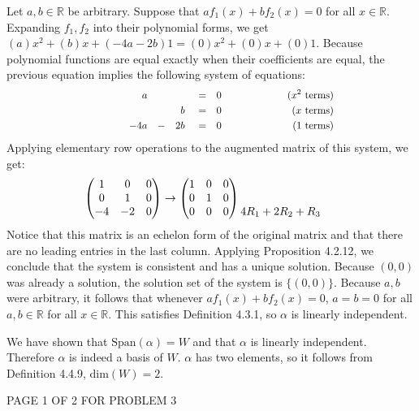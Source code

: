 \documentclass[12pt]{article}
\newenvironment{problem}[2][Problem]
{
	\begin{trivlist} 
		\item[\hskip \labelsep {\bfseries #1 #2:}]
	}
{
	\end{trivlist}
	}
\newenvironment{solution}[1][Solution]
{
	\begin{trivlist} 
		\item[\hskip \labelsep {\itshape #1:}]
	}
	{
	\end{trivlist}
}
\begin{document}
\begin{problem}{3}
\begin{solution}
Let $a,b \in \mathbb{R}$ be arbitrary. Suppose that $a f_1(x) + b f_2(x) = 0$ for all $x \in \mathbb{R}$. Expanding $f_1,f_2$ into their polynomial forms, we get $(a)x^2 +(b)x + (-4a-2b)1=(0)x^2 +(0)x +(0)1$. Because polynomial functions are equal exactly when their coefficients are equal, the previous equation implies the following system of equations:
\begin{align*}
&&&&&&&& &&&&&&&& &&&&&&&& &a& &\hphantom{1}& &\hphantom{1}& &=& &0&  &&&&&&&& \hphantom{100} \text{($x^2$ terms)} &&&&&&&& &&&&&&&& \\
&&&&&&&& &&&&&&&& &&&&&&&& &\hphantom{1}& &\hphantom{1}& &b& &=& &0&  &&&&&&&& \hphantom{100} \text{($x$ terms)} &&&&&&&& &&&&&&&& \\
&&&&&&&& &&&&&&&& &&&&&&&& -4&a& &-& 2&b& &=& &0&  &&&&&&&& \hphantom{100} \text{($1$ terms)} &&&&&&&& &&&&&&&& \\
\end{align*}
Applying elementary row operations to the augmented matrix of this system, we get:
\begin{align*}
\begin{pmatrix} 1&0&0\\0&1&0\\-4&-2&0 \end{pmatrix} &\rightarrow \begin{pmatrix} 1&0&0\\0&1&0\\0&0&0 \end{pmatrix} \begin{matrix} \hphantom{1} \\ \hphantom{1} \\ 4R_1+2R_2+R_3\hphantom{1} \end{matrix}
\end{align*}
Notice that this matrix is an echelon form of the original matrix and that there are no leading entries in the last column. Applying Proposition 4.2.12, we conclude that the system is consistent and has a unique solution. Because $(0,0)$ was already a solution, the solution set of the system is $\{(0,0)\}$. Because $a,b$ were arbitrary, it follows that whenever $a f_1(x) + b f_2(x) = 0$, $a=b=0$ for all $a,b \in \mathbb{R}$ for all $x \in \mathbb{R}$. This satisfies Definition 4.3.1, so $\alpha$ is linearly independent.

We have shown that $\text{Span}(\alpha) = W$ and that $\alpha$ is linearly independent. Therefore $\alpha$ is indeed a basis of $W$. $\alpha$ has two elements, so it follows from Definition 4.4.9, dim$(W)=2$.
\end{solution}
\vfill
\centerline{PAGE 1 OF 2 FOR PROBLEM 3}
\end{problem}
\end{document}
